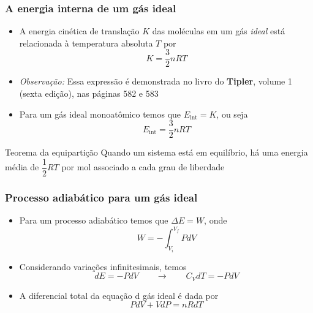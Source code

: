 \documentclass[t,%
brazilian,%
11pt,%
aspectratio=169,%
table%
]{beamer}
\begin{document}
\begin{frame}
    \frametitle{A energia interna de um gás ideal}
    \begin{itemize}
        \item A energia cinética de translação $K$ das moléculas em um gás
            \textit{ideal} está relacionada à temperatura absoluta $T$ por
            \[
                K=\frac{3}{2} nRT
            \]
        \item \textit{Observação:} Essa expressão é demonstrada no livro do
            \textbf{Tipler}, volume 1 (sexta edição), nas páginas 582 e 583

        \item Para um gás ideal monoatômico temos que $E_{\text{int}} = K$, ou seja
            \[
                E_{\text{int}}=\frac{3}{2} nRT
            \]
    \end{itemize}

    \begin{block}{Teorema da equipartição}
        Quando um sistema está em equilíbrio, há uma energia média de
        $\dfrac{1}{2}RT$ por mol associado a cada grau de liberdade
    \end{block}
\end{frame}


\begin{frame}
    \frametitle{Processo adiabático para um gás ideal}
    \begin{itemize}
        \item Para um processo adiabático temos que $\Delta E = W$, onde 
            \[
                W=-\int_{V_i}^{V_f} PdV
            \]

        \item Considerando variações infinitesimais, temos
            \[
                dE = -PdV \qquad \rightarrow \qquad C_V dT = -PdV
            \]

        \item A diferencial total da equação d gás ideal é dada por
            \[
                PdV + VdP = nRdT
            \]
    \end{itemize}
\end{frame}
\end{document}
